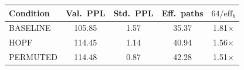 \begin{tabular}{lcccc}
\toprule
Condition & Val.\ PPL & Std.\ PPL & Eff.\ paths & $64/\mathrm{eff}_b$ \\
\midrule
BASELINE & 105.85 & 1.57 & 35.37 & 1.81$\times$ \\
HOPF & 114.45 & 1.14 & 40.94 & 1.56$\times$ \\
PERMUTED & 114.48 & 0.87 & 42.28 & 1.51$\times$ \\
\bottomrule
\end{tabular}
